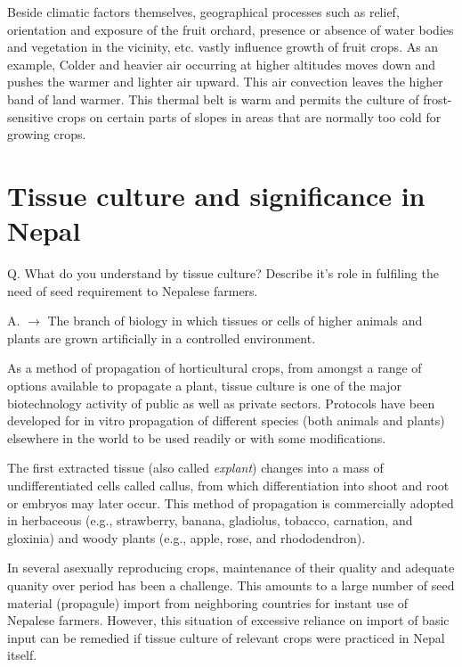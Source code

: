 \documentclass[
  openany]{book}
\begin{document}
Beside climatic factors themselves, geographical processes such as relief, orientation and exposure of the fruit orchard, presence or absence of water bodies and vegetation in the vicinity, etc. vastly influence growth of fruit crops. As an example, Colder and heavier air occurring at higher altitudes moves down and pushes the warmer and lighter air upward. This air convection leaves the higher band of land warmer. This thermal belt is warm and permits the culture of frost-sensitive crops on certain parts of slopes in areas that are normally too cold for growing crops.

\hypertarget{tissue-culture-and-significance-in-nepal}{%
\section{Tissue culture and significance in Nepal}\label{tissue-culture-and-significance-in-nepal}}

Q. What do you understand by tissue culture? Describe it's role in fulfiling the need of seed requirement to Nepalese farmers.

A. \(\longrightarrow\) The branch of biology in which tissues or cells of higher animals and plants are grown artificially in a controlled environment.

As a method of propagation of horticultural crops, from amongst a range of options available to propagate a plant, tissue culture is one of the major biotechnology activity of public as well as private sectors. Protocols have been developed for in vitro propagation of different species (both animals and plants) elsewhere in the world to be used readily or with some modifications.

The first extracted tissue (also called \emph{explant}) changes into a mass of undifferentiated cells called callus, from which differentiation into shoot and root or embryos may later occur. This method of propagation is commercially adopted in herbaceous (e.g., strawberry, banana, gladiolus, tobacco, carnation, and gloxinia) and woody plants (e.g., apple, rose, and rhododendron).

In several asexually reproducing crops, maintenance of their quality and adequate quanity over period has been a challenge. This amounts to a large number of seed material (propagule) import from neighboring countries for instant use of Nepalese farmers. However, this situation of excessive reliance on import of basic input can be remedied if tissue culture of relevant crops were practiced in Nepal itself.
\end{document}
